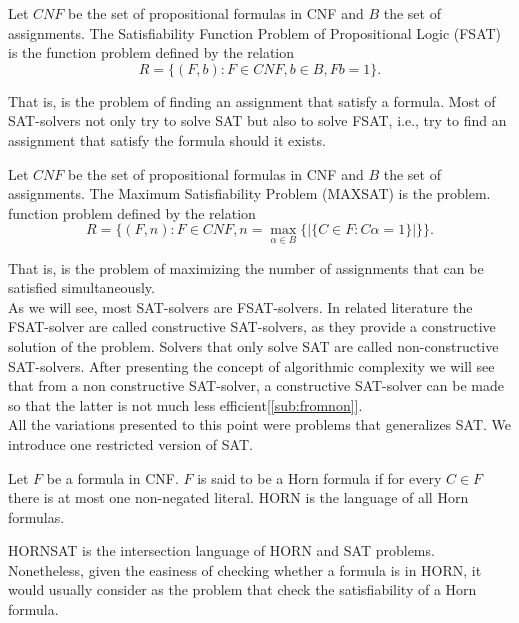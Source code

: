 \begin{definition}
  Let $CNF$ be the set of propositional formulas in CNF and $B$ the set of assignments.  The Satisfiability Function Problem of Propositional Logic (FSAT) is the function problem defined by the relation $$R=\{(F, b): F\in CNF, b \in B, Fb = 1\}.$$
\end{definition}
That is, is the problem of finding an assignment that satisfy a formula. Most of SAT-solvers not only try to solve SAT but also to solve FSAT, i.e., try to find an assignment that satisfy  the formula should it exists.
\begin{definition}
  Let $CNF$ be the set of propositional formulas in CNF and $B$ the set of assignments. The Maximum Satisfiability Problem (MAXSAT) is the problem. function problem defined by the relation $$R=\{(F,n) : F\in CNF, n = \max_{\alpha \in B}\{ | \{C\in F : C\alpha =1 \}| \}\}.$$
\end{definition}

That is, is the problem of maximizing the number of assignments that can be satisfied simultaneously.\\

As we will see, most SAT-solvers are FSAT-solvers. In related literature the FSAT-solver are called constructive SAT-solvers, as they provide a constructive solution of the problem. Solvers that only solve SAT are called non-constructive SAT-solvers. After presenting the concept of algorithmic complexity we will see that from a non constructive SAT-solver, a constructive SAT-solver can be made so that the latter is not much less efficient[\ref{sub:fromnon}].\\

All the variations presented to this point were problems that generalizes SAT. We introduce one restricted version of SAT.

\begin{definition}
  Let $F$ be a formula in CNF. $F$ is said to be a Horn formula if for every $C \in F$ there is at most one non-negated literal. HORN is the language of all Horn formulas.
\end{definition}

\begin{definition}
  HORNSAT is the intersection language of HORN and SAT problems. Nonetheless, given the easiness of checking whether a formula is in HORN, it would usually consider as the problem that check the satisfiability of a Horn formula.
\end{definition}

